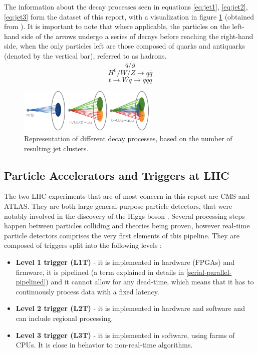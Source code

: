 The information about the decay processes seen in equations \ref{eq:jet1}, \ref{eq:jet2}, \ref{eq:jet3} form the dataset of this report, with a visualization in figure \ref{fig:jedi-jets} (obtained from \cite{9-newman2019jedi-net:}). It is important to note that where applicable, the particles on the left-hand side of the arrows undergo a series of decays before reaching the right-hand side, when the only particles left are those composed of quarks and antiquarks (denoted by the vertical bar), referred to as hadrons.
\begin{equation}\label{eq:jet1}
  q / g
\end{equation}
\begin{equation}\label{eq:jet2}
  H^0 / W / Z \rightarrow q\overline{q}
\end{equation}
\begin{equation}\label{eq:jet3}
  t \rightarrow Wq \rightarrow q\overline{q}q
\end{equation}

\begin{figure}[hpt!]
  \centering
  \includegraphics[trim={0cm 0cm 0cm 0cm}, width=0.6\textwidth, center]{background/jedi_jets.png}
  \caption{Representation of different decay processes, based on the number of resulting jet clusters.}
  \label{fig:jedi-jets}
\end{figure}

\subsection{Particle Accelerators and Triggers at LHC}\label{triggers}
The two LHC experiments that are of most concern in this report are CMS and ATLAS. They are both large general-purpose particle detectors, that were notably involved in the discovery of the Higgs boson \cite{47-greeene2013higgs}. Several processing steps happen between particles colliding and theories being proven, however real-time particle detectors comprises the very first elements of this pipeline. They are composed of triggers split into the following levels \citep[p.16]{48-trigger}:

\begin{itemize}
  \item \textbf{Level 1 trigger (L1T)} - it is implemented in hardware (FPGAs) and firmware, it is pipelined (a term explained in details in \autoref{serial-parallel-pipelined}) and it cannot allow for any dead-time, which means that it has to continuously process data with a fixed latency.
  \item \textbf{Level 2 trigger (L2T)} - it is implemented in hardware and software and can include regional processing.
  \item \textbf{Level 3 trigger (L3T)} - it is implemented in software, using farms of CPUs. It is close in behavior to non-real-time algorithms.
\end{itemize}

